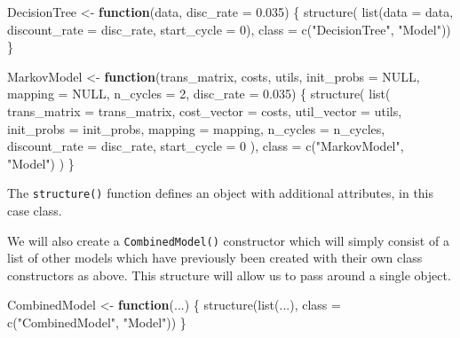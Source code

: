 \documentclass[
]{article}
\newenvironment{Shaded}{\begin{snugshade}}{\end{snugshade}}
\newcommand{\AttributeTok}[1]{\textcolor[rgb]{0.40,0.45,0.13}{#1}}
\newcommand{\ConstantTok}[1]{\textcolor[rgb]{0.56,0.35,0.01}{#1}}
\newcommand{\ControlFlowTok}[1]{\textcolor[rgb]{0.00,0.23,0.31}{\textbf{#1}}}
\newcommand{\DecValTok}[1]{\textcolor[rgb]{0.68,0.00,0.00}{#1}}
\newcommand{\FloatTok}[1]{\textcolor[rgb]{0.68,0.00,0.00}{#1}}
\newcommand{\FunctionTok}[1]{\textcolor[rgb]{0.28,0.35,0.67}{#1}}
\newcommand{\NormalTok}[1]{\textcolor[rgb]{0.00,0.23,0.31}{#1}}
\newcommand{\OtherTok}[1]{\textcolor[rgb]{0.00,0.23,0.31}{#1}}
\newcommand{\StringTok}[1]{\textcolor[rgb]{0.13,0.47,0.30}{#1}}
\begin{document}
\begin{Shaded}
\begin{Highlighting}[]
\NormalTok{DecisionTree }\OtherTok{\textless{}{-}} \ControlFlowTok{function}\NormalTok{(data, }\AttributeTok{disc\_rate =} \FloatTok{0.035}\NormalTok{) \{}
  \FunctionTok{structure}\NormalTok{(}
    \FunctionTok{list}\NormalTok{(}\AttributeTok{data =}\NormalTok{ data,}
         \AttributeTok{discount\_rate =}\NormalTok{ disc\_rate,}
         \AttributeTok{start\_cycle   =} \DecValTok{0}\NormalTok{),}
    \AttributeTok{class =} \FunctionTok{c}\NormalTok{(}\StringTok{"DecisionTree"}\NormalTok{, }\StringTok{"Model"}\NormalTok{))}
\NormalTok{\}}

\NormalTok{MarkovModel }\OtherTok{\textless{}{-}} \ControlFlowTok{function}\NormalTok{(trans\_matrix, }
\NormalTok{                        costs, utils, }
                        \AttributeTok{init\_probs =} \ConstantTok{NULL}\NormalTok{, }
                        \AttributeTok{mapping =} \ConstantTok{NULL}\NormalTok{, }
                        \AttributeTok{n\_cycles =} \DecValTok{2}\NormalTok{, }
                        \AttributeTok{disc\_rate =} \FloatTok{0.035}\NormalTok{) \{}
  \FunctionTok{structure}\NormalTok{(}
    \FunctionTok{list}\NormalTok{(}
      \AttributeTok{trans\_matrix  =}\NormalTok{ trans\_matrix,}
      \AttributeTok{cost\_vector   =}\NormalTok{ costs,}
      \AttributeTok{util\_vector   =}\NormalTok{ utils,}
      \AttributeTok{init\_probs    =}\NormalTok{ init\_probs,}
      \AttributeTok{mapping       =}\NormalTok{ mapping,}
      \AttributeTok{n\_cycles      =}\NormalTok{ n\_cycles,}
      \AttributeTok{discount\_rate =}\NormalTok{ disc\_rate,}
      \AttributeTok{start\_cycle   =} \DecValTok{0}
\NormalTok{    ),}
    \AttributeTok{class =} \FunctionTok{c}\NormalTok{(}\StringTok{"MarkovModel"}\NormalTok{, }\StringTok{"Model"}\NormalTok{)}
\NormalTok{  )}
\NormalTok{\}}
\end{Highlighting}
\end{Shaded}

The \texttt{structure()} function defines an object with additional
attributes, in this case class.

We will also create a \texttt{CombinedModel()} constructor which will
simply consist of a list of other models which have previously been
created with their own class constructors as above. This structure will
allow us to pass around a single object.

\begin{Shaded}
\begin{Highlighting}[]
\NormalTok{CombinedModel }\OtherTok{\textless{}{-}} \ControlFlowTok{function}\NormalTok{(...) \{}
  \FunctionTok{structure}\NormalTok{(}\FunctionTok{list}\NormalTok{(...), }
            \AttributeTok{class =} \FunctionTok{c}\NormalTok{(}\StringTok{"CombinedModel"}\NormalTok{, }\StringTok{"Model"}\NormalTok{))}
\NormalTok{\}}
\end{Highlighting}
\end{Shaded}
\end{document}
